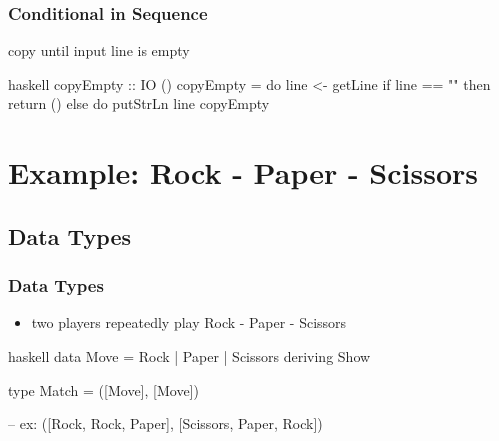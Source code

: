 \documentclass[dvipsnames]{beamer}
\theoremstyle{plain}
\begin{document}
\begin{frame}[fragile]
  \frametitle{Conditional in Sequence}

  \begin{exampleblock}{copy until input line is empty}
    \begin{pygments}{haskell}
copyEmpty :: IO ()
copyEmpty = do line <- getLine
               if line == ""
                   then return ()
                   else do putStrLn line
                           copyEmpty
    \end{pygments}
  \end{exampleblock}
\end{frame}

\section{Example: Rock - Paper - Scissors}

\subsection{Data Types}

\begin{frame}[fragile]
  \frametitle{Data Types}

  \begin{itemize}
    \item two players repeatedly play Rock - Paper - Scissors
  \end{itemize}

  \begin{exampleblock}{}
    \begin{pygments}{haskell}
data Move = Rock | Paper | Scissors
            deriving Show

type Match = ([Move], [Move])

-- ex: ([Rock, Rock, Paper], [Scissors, Paper, Rock])
    \end{pygments}
  \end{exampleblock}
\end{frame}
\end{document}
